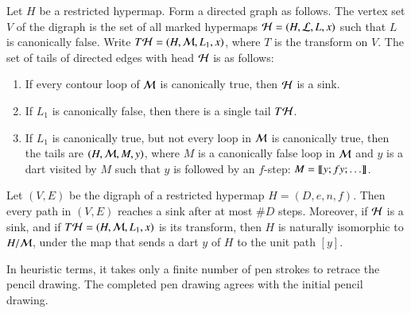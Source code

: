 \begin{definition}
Let $H$ be a restricted hypermap.  Form a directed graph as follows.
The vertex set $V$ of the digraph is the set of all marked hypermaps 
${\cal H}=(H,{\cal L},L,x)$ such that $L$ is canonically false.  
Write $T{\cal H} = (H,{\cal M},L_1,x)$, where $T$ is the transform on $V$.  
The set of tails of directed edges with head ${\cal H}$ is as follows:
\begin{enumerate}\wasitemize 
\item If every contour loop of ${\cal M}$ is canonically true, then ${\cal H}$ is a sink.
\item If $L_1$ is canonically false, 
then there is a single tail $T{\cal H}$.
\item If $L_1$ is canonically true, but not every loop in ${\cal M}$ is canonically true,
then the tails are $(H,{\cal M},M,y)$, where $M$ is a 
canonically false loop in ${\cal M}$ and $y$ is a dart visited by $M$ such
that $y$ is followed by an $f$-step:  $M = {\llbracket{y;f y;\ldots}\rrbracket}$.
\end{enumerate}\wasitemize 
\end{definition}

\begin{lemma}\label{lemma:digraph-sink}
Let $(V,E)$ be the digraph of a restricted hypermap $H=(D,e,n,f)$.  Then every path
in $(V,E)$ reaches a sink after at most $\#D$ steps.  Moreover, if ${\cal H}$ is
a sink, and if $T{\cal H} =(H,{\cal M},L_1,x)$ is its transform, then
$H$ is naturally isomorphic to $H/{\cal M}$, under the map that sends
a dart $y$ of $H$ to the unit path $[y]$.
\end{lemma}

In heuristic terms, it takes only a finite number of pen strokes to
retrace the pencil drawing.  The completed pen drawing agrees with the
initial pencil drawing.

